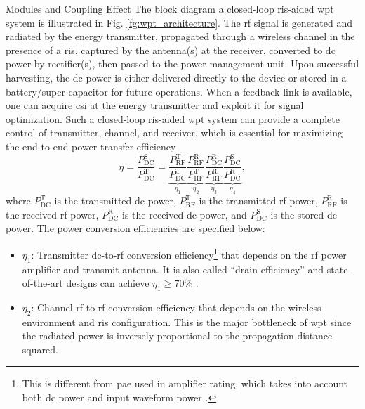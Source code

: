 \begin{section}{}
\begin{subsection}{Modules and Coupling Effect}
		The block diagram a closed-loop \gls{ris}-aided \gls{wpt} system is illustrated in Fig. \ref{fg:wpt_architecture}.
		The \gls{rf} signal is generated and radiated by the energy transmitter, propagated through a wireless channel in the presence of a \gls{ris}, captured by the antenna(s) at the receiver, converted to \gls{dc} power by rectifier(s), then passed to the power management unit.
		Upon successful harvesting, the \gls{dc} power is either delivered directly to the device or stored in a battery/super capacitor for future operations.
		When a feedback link is available, one can acquire \gls{csi} at the energy transmitter and exploit it for signal optimization.
		Such a closed-loop \gls{ris}-aided \gls{wpt} system can provide a complete control of transmitter, channel, and receiver, which is essential for maximizing the end-to-end power transfer efficiency
		\begin{equation}
			\eta = \frac{P_{\mathrm{DC}}^\mathrm{S}}{P_{\mathrm{DC}}^\mathrm{T}} = \underbrace{\frac{P_{\mathrm{RF}}^\mathrm{T}}{P_{\mathrm{DC}}^\mathrm{T}}}_{\eta_1} \underbrace{\frac{P_{\mathrm{RF}}^\mathrm{R}}{P_{\mathrm{RF}}^\mathrm{T}}}_{\eta_2} \underbrace{\frac{P_{\mathrm{DC}}^\mathrm{R}}{P_{\mathrm{RF}}^\mathrm{R}}}_{\eta_3} \underbrace{\frac{P_{\mathrm{DC}}^\mathrm{S}}{P_{\mathrm{DC}}^\mathrm{R}}}_{\eta_4},
		\end{equation}
		where $P_{\mathrm{DC}}^\mathrm{T}$ is the transmitted \gls{dc} power, $P_{\mathrm{RF}}^\mathrm{T}$ is the transmitted \gls{rf} power, $P_{\mathrm{RF}}^\mathrm{R}$ is the received \gls{rf} power, $P_{\mathrm{DC}}^\mathrm{R}$ is the received \gls{dc} power, and $P_{\mathrm{DC}}^\mathrm{S}$ is the stored \gls{dc} power.
		The power conversion efficiencies are specified below:
		\begin{itemize}
			\item $\eta_1$: Transmitter \gls{dc}-to-\gls{rf} conversion efficiency\footnote{This is different from \gls{pae} used in amplifier rating, which takes into account both \gls{dc} power and input waveform power \cite{Joung2015}.} that depends on the \gls{rf} power amplifier and transmit antenna. It is also called ``drain efficiency'' and state-of-the-art designs can achieve $\eta_1 \ge 70\%$ \cite{Alizadeh2020}.
			\item $\eta_2$: Channel \gls{rf}-to-\gls{rf} conversion efficiency that depends on the wireless environment and \gls{ris} configuration. This is the major bottleneck of \gls{wpt} since the radiated power is inversely proportional to the propagation distance squared.

\end{itemize}
\end{subsection}
\end{section}
